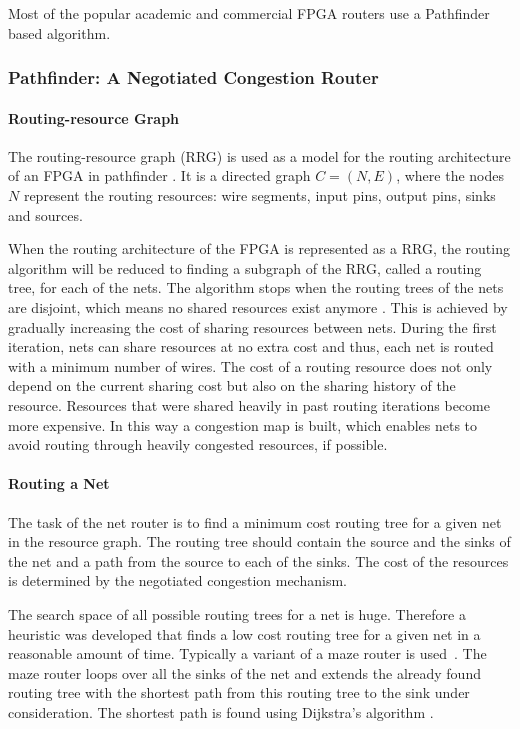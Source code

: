 \documentclass[a4paper,oneside,12pt]{article}
\begin{document}
Most of the popular academic and commercial FPGA routers use a Pathfinder based algorithm\cite{vprboek,betz1997vanppartffr}.

\subsubsection{{\sc Pathfinder}: A Negotiated Congestion Router}
\label{sec:pathfinder}
\paragraph{Routing-resource Graph}
The routing-resource graph (RRG) is used as a model for the routing architecture of an FPGA in {\sc pathfinder} \cite{mcmurchie1995panprff}. It is a directed graph $C=(N,E)$, where the nodes $N$ represent the routing resources: wire segments, input pins, output pins, sinks and sources.

When the routing architecture of the FPGA is represented as a RRG, the routing algorithm will be reduced to finding a subgraph of the RRG, called a routing tree, for each of the nets. The algorithm stops when the routing trees of the nets are disjoint, which means no shared resources exist anymore \cite{nair1987asyetfgw}.
This is achieved by gradually increasing the cost of sharing resources between nets. During the first iteration, nets can share resources at no extra cost and thus, each net is routed with a minimum number of wires. The cost of a routing resource does not only depend on the current sharing cost but also on the sharing history of the resource. Resources that were shared heavily in past routing iterations become more expensive. In this way a congestion map is built, which enables nets to avoid routing through heavily congested resources, if possible.

\paragraph{Routing a Net}
The task of the net router is to find a minimum cost routing tree for a given net in the resource graph. The routing tree should contain the source and the sinks of the net and a path from the source to each of the sinks. The cost of the resources is determined by the negotiated congestion mechanism.

The search space of all possible routing trees for a net is huge. Therefore a heuristic was developed that finds a low cost routing tree for a given net in a reasonable amount of time. Typically a variant of a maze router is used~\cite{lee1961aafpcaia}. The maze router loops over all the sinks of the net and extends the already found routing tree with the shortest path from this routing tree to the sink under consideration. The shortest path is found using Dijkstra's algorithm \cite{dijkstra1959anotpicwg}.
\end{document}

